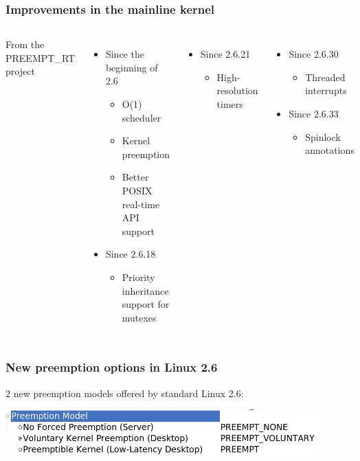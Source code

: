 \begin{frame}
  \frametitle{Improvements in the mainline kernel}
  \begin{columns}[T]
    From the PREEMPT\_RT project
    \begin{itemize}
    \item Since the beginning of 2.6
      \begin{itemize}
      \item O(1) scheduler
      \item Kernel preemption
      \item Better POSIX real-time API support
      \end{itemize}
    \item Since 2.6.18
      \begin{itemize}
      \item Priority inheritance support for mutexes
      \end{itemize}
    \end{itemize}
    \begin{itemize}
    \item Since 2.6.21
      \begin{itemize}
      \item High-resolution timers
      \end{itemize}
    \end{itemize}
    \begin{itemize}
    \item Since 2.6.30
      \begin{itemize}
      \item Threaded interrupts
      \end{itemize}
    \item Since 2.6.33
      \begin{itemize}
      \item Spinlock annotations
      \end{itemize}
    \end{itemize}
  \end{columns}
  \vspace{0.5cm}
\end{frame}

\begin{frame}
  \frametitle{New preemption options in Linux 2.6}
  2 new preemption models offered by standard Linux 2.6:
  \begin{center}
    \includegraphics[width=0.9\textwidth]{slides/sysdev-realtime/kernel-config-preemption.png}
  \end{center}
\end{frame}

